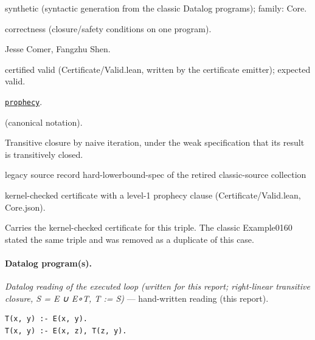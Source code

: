 \documentclass[10pt]{article}
\begin{document}
\begin{description}[leftmargin=2.6cm,style=nextline,itemsep=1pt]

\item[Category] synthetic (syntactic generation from the classic Datalog programs); family: Core.

\item[Kind] correctness (closure/safety conditions on one program).

\item[Contributors] Jesse Comer, Fangzhu Shen.

\item[Status] certified valid (Certificate/Valid.lean, written by the certificate emitter); expected valid.

\item[Tags] \hyperref[tag:prophecy]{\texttt{prophecy}}.

\item[Input]  (canonical notation).

\item[Summary] Transitive closure by naive iteration, under the weak specification that its result is transitively closed.

\item[Sources] {\raggedright legacy source record hard-lowerbound-spec of the retired classic-source collection\par}

\item[Prophecy] kernel-checked certificate with a level-1 prophecy clause (Certificate/Valid.lean, Core.json).

\item[Note] Carries the kernel-checked certificate for this triple. The classic Example0160 stated the same triple and was removed as a duplicate of this case.

\end{description}

\paragraph{Datalog program(s).}

{\raggedright\textit{Datalog reading of the executed loop (written for this report; right-linear transitive closure, S = E ∪ E∘T, T := S)} --- hand-written reading (this report).\par}

\begin{Verbatim}[fontsize=\scriptsize,breaklines=true,breakanywhere=true,frame=single,framesep=1.5mm]
T(x, y) :- E(x, y).
T(x, y) :- E(x, z), T(z, y).
\end{Verbatim}
\end{document}

